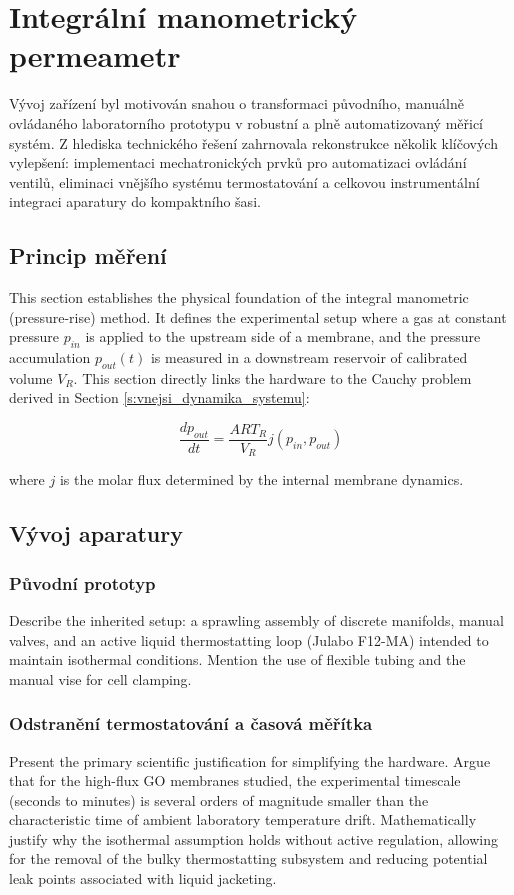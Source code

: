 \section{Integrální manometrický permeametr}\label{s:integralni_manometricky_permeametr}
Vývoj zařízení byl motivován snahou o transformaci původního, manuálně ovládaného laboratorního prototypu v robustní a plně automatizovaný měřicí systém. Z hlediska technického řešení zahrnovala rekonstrukce několik klíčových vylepšení: implementaci mechatronických prvků pro automatizaci ovládání ventilů, eliminaci vnějšího systému termostatování a celkovou instrumentální integraci aparatury do kompaktního šasi.
\subsection{Princip měření}\label{ss:princip_mereni}


This section establishes the physical foundation of the integral manometric (pressure-rise) method. It defines the experimental setup where a gas at constant pressure $p_{in}$ is applied to the upstream side of a membrane, and the pressure accumulation $p_{out}(t)$ is measured in a downstream reservoir of calibrated volume $V_{R}$. This section directly links the hardware to the Cauchy problem derived in Section \ref{s:vnejsi_dynamika_systemu}:

$$ \frac{dp_{out}}{dt} = \frac{A R T_{R}}{V_{R}} j(p_{in}, p_{out}) $$

where $j$ is the molar flux determined by the internal membrane dynamics.

\subsection{Vývoj aparatury}\label{ss:vyvoj_aparatury}

\subsubsection{Původní prototyp}\label{sss:puvodni_prototyp}
Describe the inherited setup: a sprawling assembly of discrete manifolds, manual valves, and an active liquid thermostatting loop (Julabo F12-MA) intended to maintain isothermal conditions. Mention the use of flexible tubing and the manual vise for cell clamping.

\subsubsection{Odstranění termostatování a časová měřítka}\label{sss:odstraneni_termostatu}
Present the primary scientific justification for simplifying the hardware. Argue that for the high-flux GO membranes studied, the experimental timescale (seconds to minutes) is several orders of magnitude smaller than the characteristic time of ambient laboratory temperature drift. Mathematically justify why the isothermal assumption holds without active regulation, allowing for the removal of the bulky thermostatting subsystem and reducing potential leak points associated with liquid jacketing.


